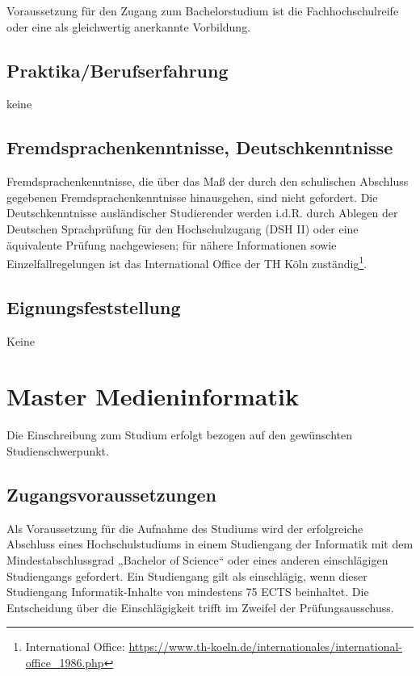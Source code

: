 Voraussetzung für den Zugang zum Bachelorstudium ist die
Fachhochschulreife oder eine als gleichwertig anerkannte Vorbildung.

\subsection{Praktika/Berufserfahrung}\label{praktikaberufserfahrung}

keine

\subsection{Fremdsprachenkenntnisse,
Deutschkenntnisse}\label{fremdsprachenkenntnisse-deutschkenntnisse}

Fremdsprachenkenntnisse, die über das Maß der durch den schulischen
Abschluss gegebenen Fremdsprachenkenntnisse hinausgehen, sind nicht
gefordert. Die Deutschkenntnisse ausländischer Studierender werden
i.d.R. durch Ablegen der Deutschen Sprachprüfung für den Hochschulzugang
(DSH II) oder eine äquivalente Prüfung nachgewiesen; für nähere
Informationen sowie Einzelfallregelungen ist das International Office
der TH Köln zuständig\footnote{International Office:
  \url{https://www.th-koeln.de/internationales/international-office\_1986.php}}.

\subsection{Eignungsfeststellung}\label{eignungsfeststellung}

Keine

\section{Master Medieninformatik}\label{master-medieninformatik-1}

Die Einschreibung zum Studium erfolgt bezogen auf den gewünschten
Studienschwerpunkt.

\subsection{Zugangsvoraussetzungen}\label{zugangsvoraussetzungen-1}

Als Voraussetzung für die Aufnahme des Studiums wird der erfolgreiche
Abschluss eines Hochschulstudiums in einem Studiengang der Informatik
mit dem Mindestabschlussgrad „Bachelor of Science`` oder eines anderen
einschlägigen Studiengangs gefordert. Ein Studiengang gilt als
einschlägig, wenn dieser Studiengang Informatik-Inhalte von mindestens
75 ECTS beinhaltet. Die Entscheidung über die Einschlägigkeit trifft im
Zweifel der Prüfungsausschuss.

